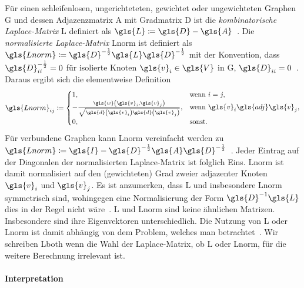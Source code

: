 Für einen schleifenlosen, ungerichteteten, gewichtet oder ungewichteten Graphen \gls{G} und dessen Adjazenzmatrix \gls{A} mit Gradmatrix \gls{D} ist die \emph{kombinatorische Laplace-Matrix} \gls{L} definiert als $\gls{L} \coloneqq \gls{D} - \gls{A}$~\cite{Chung}.
Die \emph{normalisierte Laplace-Matrix} \gls{Lnorm} ist definiert als $\gls{Lnorm} \coloneqq \gls{D}^{-\frac{1}{2}} \gls{L} \gls{D}^{-\frac{1}{2}}$ mit der Konvention, dass $\gls{D}^{-\frac{1}{2}}_{ii} = 0$ für isolierte Knoten $\gls{v}_i \in \gls{V}$ in \gls{G}, \dhe{} $\gls{D}_{ii} = 0$~\cite{Chung}.
Daraus ergibt sich die elementweise Definition
\begin{equation*}
  \gls{Lnorm}_{ij} \coloneqq \begin{cases}
  1, & \text{wenn }i = j,\\
    -\frac{\gls{w}\left(\gls{v}_i, \gls{v}_j\right)}{\sqrt{\gls{d}\left(\gls{v}_i\right)\gls{d}\left(\gls{v}_j\right)}}, & \text{wenn }\gls{v}_i \gls{adj} \gls{v}_j,\\
  0, & \text{sonst.}
\end{cases}
\end{equation*}
Für verbundene Graphen kann \gls{Lnorm} vereinfacht werden zu $\gls{Lnorm} \coloneqq \gls{I} - \gls{D}^{-\frac{1}{2}} \gls{A} \gls{D}^{-\frac{1}{2}}$~\cite{Chung}.
Jeder Eintrag auf der Diagonalen der normalisierten Laplace-Matrix ist folglich Eins.
\gls{Lnorm} ist damit normalisiert auf den (gewichteten) Grad zweier adjazenter Knoten $\gls{v}_i$ und $\gls{v}_j$.
Es ist anzumerken, dass \gls{L} und insbesondere \gls{Lnorm} symmetrisch sind, wohingegen eine Normalisierung der Form $\gls{D}^{-1}\gls{L}$ dies in der Regel nicht wäre~\cite{Reuter}.
\gls{L} und \gls{Lnorm} sind keine ähnlichen Matrizen.
Insbesondere sind ihre Eigenvektoren unterschiedlich.
Die Nutzung von \gls{L} oder \gls{Lnorm} ist damit abhängig von dem Problem, welches man betrachtet~\cite{Hammond}.
Wir schreiben \gls{Lboth} wenn die Wahl der Laplace-Matrix, ob \gls{L} oder \gls{Lnorm}, für die weitere Berechnung irrelevant ist.

\paragraph{Interpretation}
\label{laplace_interpretation}


